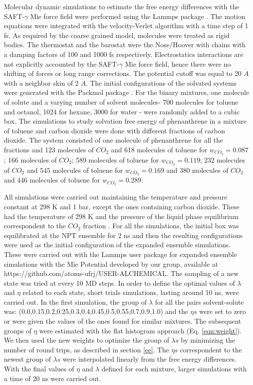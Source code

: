 Molecular dynamic simulations to estimate the free energy differences with the SAFT-$\gamma$ Mie force field were performed using the Lammps package \cite{lammps}. The motion equations were integrated with the velocity-Verlet algorithm \cite{verlet} with a time step of 1 fs. As required by the coarse grained model,  molecules were treated as rigid bodies. The thermostat and the barostat were the Nose/Hoover with chains with a damping factors of 100 and 1000 fs respectively. Electrostatics interactions are not explicitly accounted by the SAFT-$\gamma$ Mie force field, hence there were no shifting of forces or long range corrections. The potential cutoff was equal to 20 $\dot{A}$ \cite{muller2017} with a neighbor skin of 2 $\dot{A}$. The initial configurations of the  solvated systems were generated with the Packmol package \cite{packmol}. For the binary mixtures, one molecule of solute and a varying number of solvent molecules- 700 molecules for toluene and octanol, 1024 for hexane, 3000 for water - were randomly added to a cubic box. The simulations to study solvation free energy of phenanthrene in a mixture of toluene and carbon dioxide were done with different fractions of carbon dioxide. The  system consisted of one molecule of phenanthrene for all the fractions and 123 molecules of $CO_{2}$ and 618 molecules of toluene for $w_{CO_{2}} = 0.087$; 166 molecules of $CO_{2}$; 589 molecules of toluene for $w_{CO_{2}} = 0.119$; 232 molecules of $CO_{2}$ and 545 molecules of toluene for $w_{CO_{2}} = 0.169$ and 380 molecules of $CO_{2}$ and 446 molecules of toluene for $w_{CO_{2}} = 0.289$.

All simulations were carried out maintaining the temperature and pressure constant at 298 K and 1 bar, except the ones containing carbon dioxide. These had the temperature of 298 K and the pressure of the liquid phase equilibrium correspondent to the $CO_{2}$ fraction \cite{co2toliq}. For all the simulations, the initial box was equilibrated at the NPT ensemble for 2 ns and then the resulting configurations were used as the initial configuration of the expanded ensemble simulations. These were carried out with the Lammps user package for expanded ensemble simulations with the Mie Potential developed by our group, available at https://github.com/atoms-ufrj/USER-ALCHEMICAL. The sampling of a new state was tried at every 10 MD steps. In order to define the optimal values of $\lambda$ and $\eta$ related to each state, short trials simulations, lasting around 10 ns, were carried out. In the first simulation, the group of $\lambda$ for all the pairs solvent-solute was: (0.0,0.15,0.2,0.25,0.3,0.4,0.45,0.5,0.55,0.7,0.9,1.0) and the $\eta s$ were set to zero or were given the values of the ones found for similar mixtures. The subsequent groups of $\eta$ were estimated  with the flat histogram approach (Eq. \eqref{eqn:weight}). We then used the new weights to optimize the group of $\lambda s$ by minimizing the number of round trips, as described in section \ref{ee}. The $\eta s$ correspondent to the newest group of $\lambda s$ were interpolated linearly from the free energy differences. With the final values of $\eta$ and $\lambda $ defined for each mixture, larger simulations with a time of 20 ns were carried out. 

